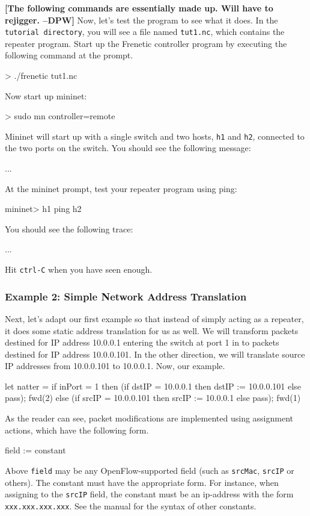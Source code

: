 \documentclass{article}
\newcommand{\finish}[2][cornellred]{\ifdraft\textcolor{#1}{\textbf{[#2]}}\fi}
\newcommand{\dpw}[1]{\finish[cornellred]{#1 --DPW}}
\newcommand{\code}[1]{\texttt{#1}}
\newcommand{\tutorialdir}{\texttt{tutorial directory}}
\begin{document}
\dpw{The following commands are essentially made up.  Will have to rejigger.}
Now, let's test the program to see what it does.  In the \tutorialdir{},
you will see a file named \code{tut1.nc}, which contains the
repeater program.  Start up the Frenetic controller program by 
executing the following command at the prompt.

\begin{progeg}
> ./frenetic tut1.nc
\end{progeg}
%
Now start up mininet:
%
\begin{progeg}
> sudo mn controller=remote
\end{progeg}
%
Mininet will start up with a single switch and two hosts, 
\code{h1} and \code{h2}, connected to the two ports on the switch.
You should see the following message:
%
\begin{progeg}
...
\end{progeg}
%
At the mininet prompt, test your repeater program using ping:
%
\begin{progeg}
mininet> h1 ping h2
\end{progeg}
%
You should see the following trace:
%
\begin{progeg}
...
\end{progeg}
%
Hit \code{ctrl-C} when you have seen enough.

\subsubsection{Example 2: Simple Network Address Translation}

Next, let's adapt our first example so that instead of simply acting
as a repeater, it does some static address translation for us as well.
We will transform packets destined for IP address 10.0.0.1 entering the 
switch at port 1 in to packets destined for IP address 10.0.0.101.
In the other direction, we will translate source IP addresses from
10.0.0.101 to 10.0.0.1.  Now, our example.
%
\begin{progeg}
let natter =
  if inPort = 1 then
    (if dstIP = 10.0.0.1 then dstIP := 10.0.0.101 else pass); 
    fwd(2)
  else 
    (if srcIP = 10.0.0.101 then srcIP := 10.0.0.1 else pass); 
    fwd(1)
\end{progeg}
%
As the reader can see, packet modifications are implemented using
assignment actions, which have the following form.
%
\begin{progeg}
field := constant
\end{progeg}
%
Above \code{field} may be any OpenFlow-supported field (such as 
\code{srcMac}, \code{srcIP} or others).  The constant must have the
appropriate form.  For instance, when assigning to the \code{srcIP}
field, the constant must be an ip-address with the form 
\code{xxx.xxx.xxx.xxx}.  See the manual for the syntax of other
constants.
\end{document}
